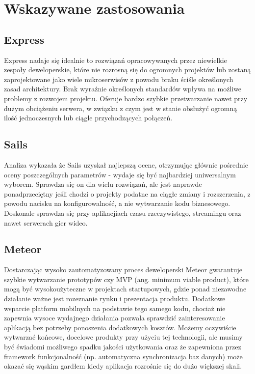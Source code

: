 \documentclass[12pt]{report}
\begin{document}
  \section{Wskazywane zastosowania}
    \subsection{Express}
      Express nadaje się idealnie to rozwiązań opracowywanych przez niewielkie zespoły deweloperskie, które nie rozrosną się do ogromnych projektów lub zostaną zaprojektowane jako wiele mikroserwisów z powodu braku ściśle określonych zasad architektury. 
      Brak wyraźnie określonych standardów wpływa na możliwe problemy z rozwojem projektu. 
      Oferuje bardzo szybkie przetwarzanie nawet przy dużym obciążeniu serwera, w związku z czym jest w stanie obsłużyć ogromną ilość jednoczesnych lub ciągle przychodzących połączeń.

    \subsection{Sails}
      Analiza wykazała że Sails uzyskał najlepszą ocene, otrzymując głównie pośrednie oceny poszczególnych parametrów - wydaje się być najbardziej uniwersalnym wyborem.
      Sprawdza się on dla wielu rozwiązań, ale jest naprawde ponadprzeciętny jeśli chodzi o projekty podatne na ciągłe zmiany i rozszerzenia, z powodu nacisku na konfigurowalność, a nie wytwarzanie kodu biznesowego.
      Doskonale sprawdza się przy aplikacjiach czasu rzeczywistego, streamingu oraz nawet serwerach gier wideo.

    \subsection{Meteor}
      Dostarczając wysoko zautomatyzowany proces deweloperski Meteor gwarantuje szybkie wytwarzanie prototypów czy MVP (ang. minimum viable product), które mogą być wysokoużyteczne w projektach startupowych, gdzie ponad niezawodne działanie ważne jest rozeznanie rynku i prezentacja produktu.
      Dodatkowe wsparcie platform mobilnych na podstawie tego samego kodu, chociaż nie zapewnia wysoce wydajnego działania pozwala sprawdzić zainteresowanie aplikacją bez potrzeby ponoszenia dodatkowych kosztów.
      Możemy oczywiście wytwarzać końcowe, docelowe produkty przy użyciu tej technologii, ale musimy być świadomi możliwego spadku jakości użytkowania oraz że zapewniona przez framework funkcjonalność (np. automatyczna synchronizacja baz danych) może okazać się wąskim gardłem kiedy aplikacja rozrośnie się do dużo większej skali.
\end{document}
